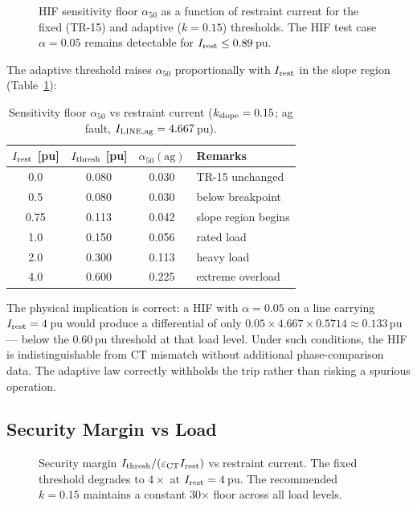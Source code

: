 \documentclass[11pt, a4paper]{article}
\begin{document}
\begin{figure}[h]
  \centering
  
  \caption{HIF sensitivity floor $\alpha_{50}$ as a function of restraint
           current for the fixed (TR-15) and adaptive ($k=0.15$) thresholds.
           The HIF test case $\alpha=0.05$ remains detectable for
           $I_{\rm rest} \leq 0.89$\,pu.}
  \label{fig:a50}
\end{figure}

The adaptive threshold raises $\alpha_{50}$ proportionally with $I_{\rm rest}$
in the slope region (Table~\ref{tab:a50}):

\begin{table}[h]
  \centering
  \caption{Sensitivity floor $\alpha_{50}$ vs restraint current
           ($k_{\rm slope}=0.15$; ag fault, $I_{\rm LINE,ag}=4.667$\,pu).}
  \label{tab:a50}
  \begin{tabular}{cccl}
    \toprule
    $I_{\rm rest}$ [pu] & $I_{\rm thresh}$ [pu]
    & $\alpha_{50}(\text{ag})$ & Remarks \\
    \midrule
    0.0  & 0.080 & 0.030 & TR-15 unchanged \\
    0.5  & 0.080 & 0.030 & below breakpoint \\
    0.75 & 0.113 & 0.042 & slope region begins \\
    1.0  & 0.150 & 0.056 & rated load \\
    2.0  & 0.300 & 0.113 & heavy load \\
    4.0  & 0.600 & 0.225 & extreme overload \\
    \bottomrule
  \end{tabular}
\end{table}

The physical implication is correct: a HIF with $\alpha=0.05$ on a line
carrying $I_{\rm rest} = 4$\,pu would produce a differential of only
$0.05 \times 4.667 \times 0.5714 \approx 0.133$\,pu --- below the 0.60\,pu
threshold at that load level.  Under such conditions, the HIF is
indistinguishable from CT mismatch without additional phase-comparison data.
The adaptive law correctly withholds the trip rather than risking a spurious
operation.

\subsection{Security Margin vs Load}

\begin{figure}[h]
  \centering
  
  \caption{Security margin $I_{\rm thresh} / (\varepsilon_{\rm CT} I_{\rm rest})$
           vs restraint current.  The fixed threshold degrades to $4\times$
           at $I_{\rm rest}=4$\,pu.  The recommended $k=0.15$ maintains a
           constant 30$\times$ floor across all load levels.}
  \label{fig:margin}
\end{figure}
\end{document}
